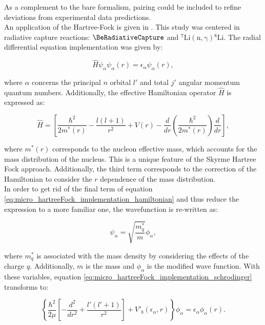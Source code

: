 \documentclass[openany]{book}
\begin{document}
As a complement to the bare formalism, pairing could be included to refine deviations from experimental data predictions. \\

An application of the Hartree-Fock is given in \cite{leanh_minhloc_2022}. This study was centered in radiative capture reactions: $\BeRadiativeCapture$ and $\mathrm{{}^{7}Li(n, \gamma){}^{8}Li}$. The radial differential equation implementation was given by: 

\begin{equation}\label{eq:micro_hartreeFock_implementation_schrodinger}
	\hat H \psi_{\alpha} \psi_{\alpha}(r) = \epsilon_\alpha \psi_{\alpha} (r), 
\end{equation}

where $\alpha$ concerns the principal $n$ orbital $l'$ and total $j'$ angular momentum quantum numbers. Additionally, the effective Hamiltonian operator $\hat H$ is expressed as: 

\begin{equation}\label{eq:micro_hartreeFock_implementation_hamiltonian}
	\hat H =  \left[\frac{\hbar^2}{2m^{*}(r)} - \frac{l(l+1)}{r^2}  + V(r) - \frac{d}{dr} \left (\frac{\hbar^2}{2m^*(r)} \right) \frac{d}{dr} \right] , 
\end{equation}

where $m^{*}(r)$ corresponds to the nucleon effective mass, which accounts for the mass distribution of the nucleus. This is a unique feature of the Skyrme Hartree Fock approach.  Additionally, the third term corresponds to the correction of the Hamiltonian to consider the $r$ dependence of the mass distribution. \\

In order to get rid of the final term of equation \ref{eq:micro_hartreeFock_implementation_hamiltonian} and thus reduce the expression to a more familiar one, the wavefunction is re-written as: 

\begin{equation}\label{eq:micro_hartreeFock_implementation_wavefunction_alternative}
	\psi_\alpha = \sqrt{\frac{m^{*}_q}{m}} \phi_\alpha,
\end{equation}

where $m^{*}_q$ is associated with the mass density by considering the effects of the charge $q$. Additionally, $m$ is the mass and $\phi_\alpha$ is the modified wave function. With these variables, equation \ref{eq:micro_hartreeFock_implementation_schrodinger} transforms to:

\begin{equation}\label{eq:micro_hartreeFock_implementation_schrodinger_modified}
	\left \{ \frac{\hbar^2}{2\mu} \left [ - \frac{d^2}{dr^2} + \frac{l'(l'+1)}{r^2} \right] + V'_b(\epsilon_\alpha, r) \right \} \phi_\alpha = \epsilon_\alpha \phi_\alpha(r).
\end{equation}
\end{document}
